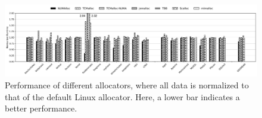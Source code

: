 \begin{figure}[!ht]
    \centering
    \includegraphics[width=7in]{SC2022/figure/8-node-parsec-perf.jpg}
    \caption{Performance of different allocators, where all data is normalized to \\ that of the default Linux allocator. Here, a lower bar indicates a better performance.
    \label{fig:perf}}
 \end{figure}

